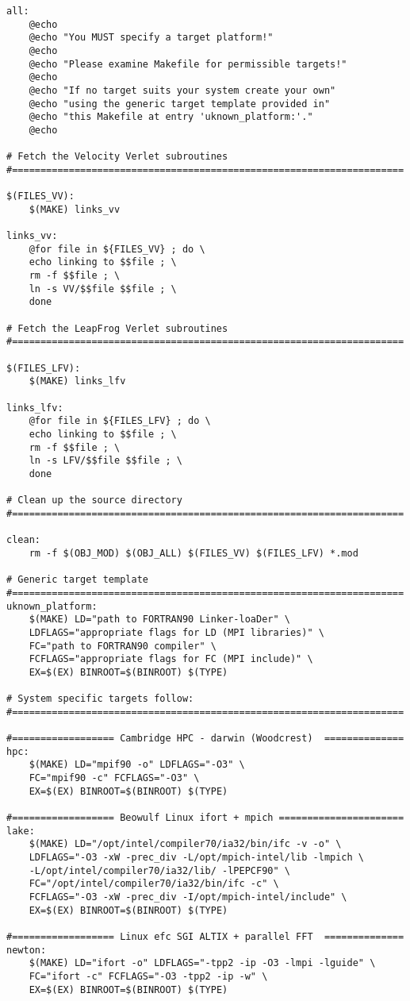 \begin{verbatim}
all:
	@echo
	@echo "You MUST specify a target platform!"
	@echo
	@echo "Please examine Makefile for permissible targets!"
	@echo
	@echo "If no target suits your system create your own"
	@echo "using the generic target template provided in"
	@echo "this Makefile at entry 'uknown_platform:'."
	@echo

# Fetch the Velocity Verlet subroutines
#=====================================================================

$(FILES_VV):
	$(MAKE) links_vv

links_vv:
	@for file in ${FILES_VV} ; do \
	echo linking to $$file ; \
	rm -f $$file ; \
	ln -s VV/$$file $$file ; \
	done

# Fetch the LeapFrog Verlet subroutines
#=====================================================================

$(FILES_LFV):
	$(MAKE) links_lfv

links_lfv:
	@for file in ${FILES_LFV} ; do \
	echo linking to $$file ; \
	rm -f $$file ; \
	ln -s LFV/$$file $$file ; \
	done

# Clean up the source directory
#=====================================================================

clean:
	rm -f $(OBJ_MOD) $(OBJ_ALL) $(FILES_VV) $(FILES_LFV) *.mod

# Generic target template
#=====================================================================
uknown_platform:
	$(MAKE) LD="path to FORTRAN90 Linker-loaDer" \
	LDFLAGS="appropriate flags for LD (MPI libraries)" \
	FC="path to FORTRAN90 compiler" \
	FCFLAGS="appropriate flags for FC (MPI include)" \
	EX=$(EX) BINROOT=$(BINROOT) $(TYPE)

# System specific targets follow:
#=====================================================================

#================== Cambridge HPC - darwin (Woodcrest)  ==============
hpc:
	$(MAKE) LD="mpif90 -o" LDFLAGS="-O3" \
	FC="mpif90 -c" FCFLAGS="-O3" \
	EX=$(EX) BINROOT=$(BINROOT) $(TYPE)

#================== Beowulf Linux ifort + mpich ======================
lake:
	$(MAKE) LD="/opt/intel/compiler70/ia32/bin/ifc -v -o" \
	LDFLAGS="-O3 -xW -prec_div -L/opt/mpich-intel/lib -lmpich \
	-L/opt/intel/compiler70/ia32/lib/ -lPEPCF90" \
	FC="/opt/intel/compiler70/ia32/bin/ifc -c" \
	FCFLAGS="-O3 -xW -prec_div -I/opt/mpich-intel/include" \
	EX=$(EX) BINROOT=$(BINROOT) $(TYPE)

#================== Linux efc SGI ALTIX + parallel FFT  ==============
newton:
	$(MAKE) LD="ifort -o" LDFLAGS="-tpp2 -ip -O3 -lmpi -lguide" \
	FC="ifort -c" FCFLAGS="-O3 -tpp2 -ip -w" \
	EX=$(EX) BINROOT=$(BINROOT) $(TYPE)


\end{verbatim}
